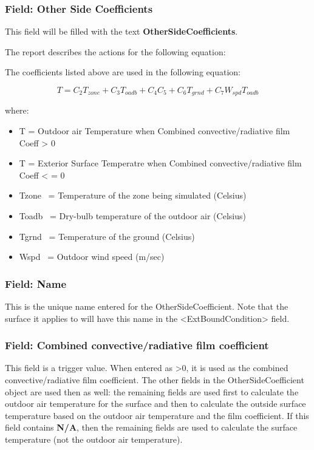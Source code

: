 \subsubsection{Field: Other Side Coefficients}\label{field-other-side-coefficients}

This field will be filled with the text \textbf{OtherSideCoefficients}.

The report describes the actions for the following equation:

The coefficients listed above are used in the following equation:

\begin{equation}
T = C_2 T_{zone} + C_3 T_{oadb} + C_4 C_5 + C_6 T_{grnd} + C_7 W_{spd} T_{oadb}
\end{equation}

where:

\begin{itemize}
\tightlist
\item
  T = Outdoor air Temperature when Combined convective/radiative film Coeff \textgreater{} 0
\item
  T = Exterior Surface Temperatre when Combined convective/radiative film Coeff \textless{} = 0
\item
  Tzone~ = Temperature of the zone being simulated (Celsius)
\item
  Toadb~ = Dry-bulb temperature of the outdoor air (Celsius)
\item
  Tgrnd~ = Temperature of the ground (Celsius)
\item
  Wspd~ = Outdoor wind speed (m/sec)
\end{itemize}

\subsubsection{Field: Name}\label{field-name-11}

This is the unique name entered for the OtherSideCoefficient. Note that the surface it applies to will have this name in the \textless{}ExtBoundCondition\textgreater{} field.

\subsubsection{Field: Combined convective/radiative film coefficient}\label{field-combined-convectiveradiative-film-coefficient}

This field is a trigger value. When entered as \textgreater{}0, it is used as the combined convective/radiative film coefficient. The other fields in the OtherSideCoefficient object are used then as well: the remaining fields are used first to calculate the outdoor air temperature for the surface and then to calculate the outside surface temperature based on the outdoor air temperature and the film coefficient. If this field contains \textbf{N/A}, then the remaining fields are used to calculate the surface temperature (not the outdoor air temperature).

